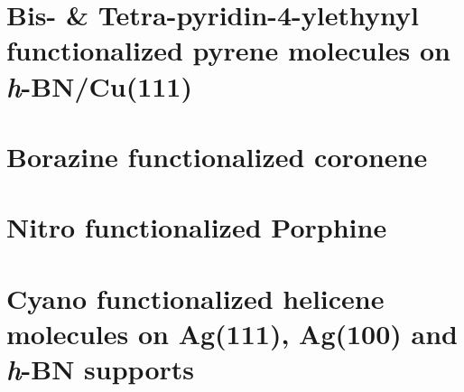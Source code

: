 \documentclass[
twoside,				%
BCOR=12mm,				%
headings=normal,		%
headsepline,			%
footsepline,			%
plainfootsepline,		%
]{scrbook}
\begin{document}
\chapter{Bis- \& Tetra-pyridin-4-ylethynyl functionalized pyrene molecules on \textit{h}-BN/Cu(111)}


\chapter{Borazine functionalized coronene}


\chapter{Nitro functionalized Porphine}
    

\chapter{Cyano functionalized helicene molecules on Ag(111), Ag(100) and \textit{h}-BN supports}


\end{document}
